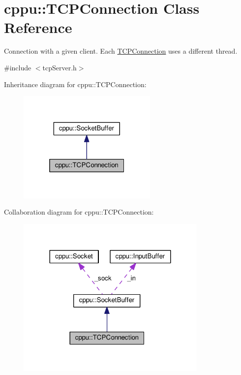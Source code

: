\hypertarget{classcppu_1_1TCPConnection}{}\section{cppu\+:\+:T\+C\+P\+Connection Class Reference}
\label{classcppu_1_1TCPConnection}


Connection with a given client. Each \hyperlink{classcppu_1_1TCPConnection}{T\+C\+P\+Connection} uses a different thread.  




{\ttfamily \#include $<$tcp\+Server.\+h$>$}



Inheritance diagram for cppu\+:\+:T\+C\+P\+Connection\+:
\nopagebreak
\begin{figure}[H]
\begin{center}
\leavevmode
\includegraphics[width=193pt]{classcppu_1_1TCPConnection__inherit__graph}
\end{center}
\end{figure}


Collaboration diagram for cppu\+:\+:T\+C\+P\+Connection\+:
\nopagebreak
\begin{figure}[H]
\begin{center}
\leavevmode
\includegraphics[width=264pt]{classcppu_1_1TCPConnection__coll__graph}
\end{center}
\end{figure}
